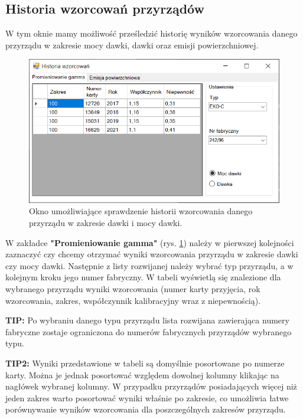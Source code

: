 \subsection{Historia wzorcowań przyrządów}
\label{historia_wzorcowań}

W tym oknie mamy możliwość prześledzić historię wyników wzorcowania danego przyrządu w zakresie mocy dawki, dawki oraz emisji powierzchniowej.

\begin{figure}[H]
	\centering
	\includegraphics{obrazki/Wyszukiwanie/historia_wzorcowan_moc.png}
	\caption{Okno umożliwiające sprawdzenie historii wzorcowania danego przyrządu w zakresie dawki i mocy dawki.}
	\label{historiaWzorcowanMoc}
\end{figure}

W zakładce \textbf{"Promieniowanie gamma"} (rys. \ref{historiaWzorcowanMoc}) należy w pierwszej kolejności zaznaczyć czy chcemy otrzymać wyniki wzorcowania przyrządu w zakresie dawki czy mocy dawki. Następnie z listy rozwijanej należy wybrać typ przyrządu, a w kolejnym kroku jego numer fabryczny. W tabeli wyświetlą się znalezione dla wybranego przyrządu wyniki wzorcowania (numer karty przyjęcia, rok wzorcowania, zakres, współczynnik kalibracyjny wraz z niepewnością).

\textbf{TIP:} Po wybraniu danego typu przyrządu lista rozwijana zawierająca numery fabryczne zostaje ograniczona do numerów fabrycznych przyrządów wybranego typu.

\textbf{TIP2:} Wyniki przedstawione w tabeli są domyślnie posortowane po numerze karty. Można je jednak posortować względem dowolnej kolumny klikając na nagłówek wybranej kolumny. W przypadku przyrządów posiadających więcej niż jeden zakres warto posortować wyniki właśnie po zakresie, co umożliwia łatwe porównywanie wyników wzorcowania dla poszczególnych zakresów przyrządu.

